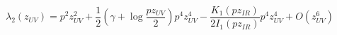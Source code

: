 \begin{equation}
\lambda_2(z_{UV})=p^2 z_{UV}^2+\frac 1 2 (\gamma+\log\frac
{pz_{UV}} 2) p^4 z_{UV}^4 - \frac {K_1(p z_{IR})} {2 I_1(p
z_{IR})} p^4 z_{UV}^4+ O(z_{UV}^6)
\end{equation}

